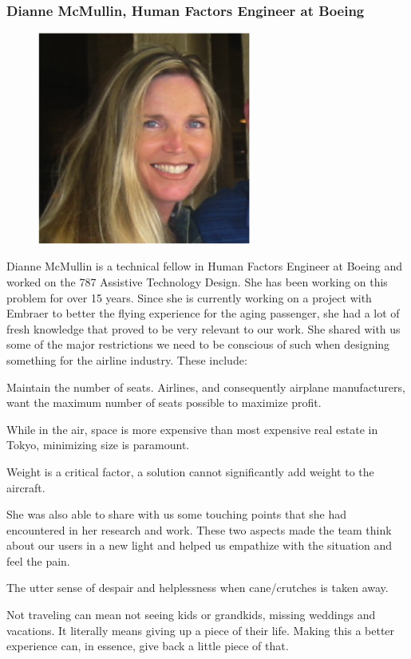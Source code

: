 \subsubsection{Dianne McMullin, Human Factors Engineer at Boeing}
\begin{figure}[h]
  \centering
     \includegraphics[width=7cm]{images/image020}
  \label{fig:20}
\end{figure}

Dianne McMullin is a technical fellow in Human Factors Engineer at Boeing and worked on the 787 Assistive Technology Design.  She has been working on this problem for over 15 years.  Since she is currently working on a project with Embraer to better the flying experience for the aging passenger, she had a lot of fresh knowledge that proved to be very relevant to our work. She shared with us some of the major restrictions we need to be conscious of such when designing something for the airline industry. These include:	
\begin{list}{-}{}
  \item Maintain the number of seats. Airlines, and consequently airplane manufacturers, want the maximum number of seats possible to maximize profit.
  \item While in the air, space is more expensive than most expensive real estate in Tokyo, minimizing size is paramount.
  \item Weight is a critical factor, a solution cannot significantly add weight to the aircraft.
\end{list}

She was also able to share with us some touching points that she had encountered in her research and work.  These two aspects made the team think about our users in a new light and helped us empathize with the situation and feel the pain.  

\begin{list}{-}{}
  \item The utter sense of despair and helplessness when cane/crutches is taken away.
  \item Not traveling can mean not seeing kids or grandkids, missing weddings and vacations. It literally means giving up a piece of their life. Making this a better experience can, in essence, give back a little piece of that.
\end{list}

